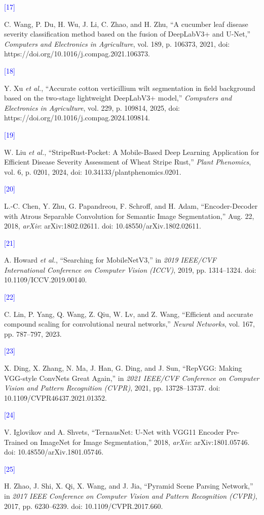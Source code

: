 \documentclass[
]{article}
\begin{document}
\hypertarget{ref:17}{\textcolor{blue}{[17]}} C. Wang, P.
Du, H. Wu, J. Li, C. Zhao, and H. Zhu, ``A cucumber leaf disease
severity classification method based on the fusion of DeepLabV3+ and
U-Net,'' \emph{Computers and Electronics in Agriculture}, vol. 189, p.
106373, 2021, doi: https://doi.org/10.1016/j.compag.2021.106373.

\hypertarget{ref:18}{\textcolor{blue}{[18]}}Y. Xu \emph{et al.}, ``Accurate cotton verticillium wilt segmentation in
field background based on the two-stage lightweight DeepLabV3+ model,''
\emph{Computers and Electronics in Agriculture}, vol. 229, p. 109814,
2025, doi: https://doi.org/10.1016/j.compag.2024.109814.

\hypertarget{ref:19}{\textcolor{blue}{[19]}} W. Liu \emph{et al.}, ``StripeRust-Pocket: A
Mobile-Based Deep Learning Application for Efficient Disease Severity
Assessment of Wheat Stripe Rust,'' \emph{Plant Phenomics}, vol. 6, p.
0201, 2024, doi: 10.34133/plantphenomics.0201.

\hypertarget{ref:20}{\textcolor{blue}{[20]}} L.-C. Chen,
Y. Zhu, G. Papandreou, F. Schroff, and H. Adam, ``Encoder-Decoder with
Atrous Separable Convolution for Semantic Image Segmentation,'' Aug. 22,
2018, \emph{arXiv}: arXiv:1802.02611. doi:
10.48550/arXiv.1802.02611.

\hypertarget{ref:21}{\textcolor{blue}{[21]}} A. Howard \emph{et al.}, ``Searching
for MobileNetV3,'' in \emph{2019 IEEE/CVF International Conference on
Computer Vision (ICCV)}, 2019, pp. 1314--1324. doi:
10.1109/ICCV.2019.00140.

\hypertarget{ref:22}{\textcolor{blue}{[22]}} C. Lin, P. Yang, Q. Wang, Z. Qiu, W. Lv, and
Z. Wang, ``Efficient and accurate compound scaling for convolutional
neural networks,'' \emph{Neural Networks}, vol. 167, pp. 787--797,
2023.

\hypertarget{ref:23}{\textcolor{blue}{[23]}} X. Ding, X.
Zhang, N. Ma, J. Han, G. Ding, and J. Sun, ``RepVGG: Making VGG-style
ConvNets Great Again,'' in \emph{2021 IEEE/CVF Conference on Computer
Vision and Pattern Recognition (CVPR)}, 2021, pp. 13728--13737. doi:
10.1109/CVPR46437.2021.01352.

\hypertarget{ref:24}{\textcolor{blue}{[24]}} V. Iglovikov and A. Shvets,
``TernausNet: U-Net with VGG11 Encoder Pre-Trained on ImageNet for Image
Segmentation,'' 2018, \emph{arXiv}: arXiv:1801.05746. doi:
10.48550/arXiv.1801.05746.

\hypertarget{ref:25}{\textcolor{blue}{[25]}} H. Zhao, J. Shi, X. Qi, X. Wang, and
J. Jia, ``Pyramid Scene Parsing Network,'' in \emph{2017 IEEE Conference
on Computer Vision and Pattern Recognition (CVPR)}, 2017, pp.
6230--6239. doi: 10.1109/CVPR.2017.660.
\end{document}
